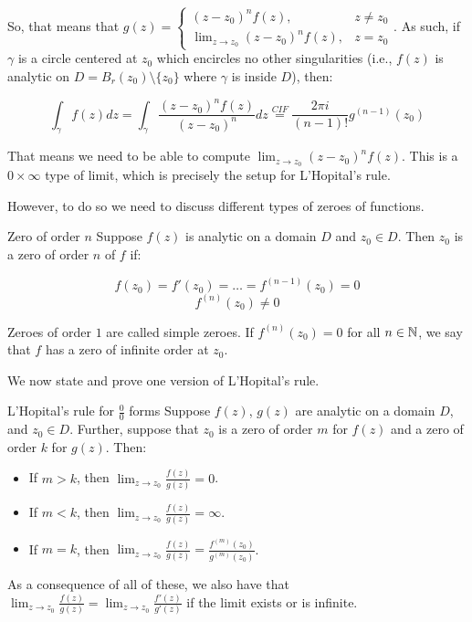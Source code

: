So, that means that $g(z) = \begin{cases} (z-z_0)^nf(z), &z\ne z_0\\ \lim_{z\rightarrow z_0} (z-z_0)^nf(z), &z = z_0\end{cases}$. As such, if $\gamma$ is a circle centered at $z_0$ which encircles no other singularities (i.e., $f(z)$ is analytic on $D = B_r(z_0)\setminus\{z_0\}$ where $\gamma$ is inside $D$), then:

$$\int_{\gamma} f(z)dz = \int_{\gamma} \frac{(z-z_0)^nf(z)}{(z-z_0)^n}dz \stackrel{CIF}{=} \frac{2\pi i}{(n-1)!}g^{(n-1)}(z_0)$$

That means we need to be able to compute $\lim_{z\rightarrow z_0} (z-z_0)^nf(z)$. This is a $0\times \infty$ type of limit, which is precisely the setup for L'Hopital's rule. 

However, to do so we need to discuss different types of zeroes of functions.

\begin{defbo}{Zero of order $n$}{}
Suppose $f(z)$ is analytic on a domain $D$ and $z_0\in D$. Then $z_0$ is a zero of order $n$ of $f$ if:

$$f(z_0) = f'(z_0) = \dots = f^{(n-1)}(z_0) = 0$$
$$f^{(n)}(z_0) \ne 0$$

Zeroes of order $1$ are called simple zeroes. If $f^{(n)}(z_0) = 0$ for all $n\in \mathbb{N}$, we say that $f$ has a zero of infinite order at $z_0$.
\end{defbo}

We now state and prove one version of L'Hopital's rule.

\begin{thmbo}{L'Hopital's rule for $\frac{0}{0}$ forms}{}
Suppose $f(z)$, $g(z)$ are analytic on a domain $D$, and $z_0\in D$. Further, suppose that $z_0$ is a zero of order $m$ for $f(z)$ and a zero of order $k$ for $g(z)$. Then:

\begin{itemize}
\item If $m > k$, then $\lim_{z\rightarrow z_0} \frac{f(z)}{g(z)} = 0$.
\item If $m < k$, then $\lim_{z\rightarrow z_0} \frac{f(z)}{g(z)} = \infty$.
\item If $m = k$, then $\lim_{z\rightarrow z_0} \frac{f(z)}{g(z)} = \frac{f^{(m)}(z_0)}{g^{(m)}(z_0)}$.
\end{itemize}

As a consequence of all of these, we also have that $\lim_{z\rightarrow z_0} \frac{f(z)}{g(z)} = \lim_{z\rightarrow z_0} \frac{f'(z)}{g'(z)}$ if the limit exists or is infinite.
\end{thmbo}

